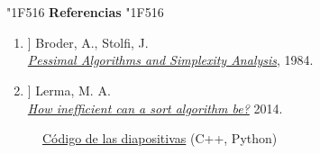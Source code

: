 \documentclass[plain]{beamer}
\newcommand{\ee}[1]{{\emojifont \char"#1{}}}
\begin{document}
\section{}
\begin{frame}\large
	\begin{center}
		{\LARGE \ee{1F516} \textbf{Referencias} \ee{1F516}}
	\end{center}
	\begin{enumerate}
		\item[\color{black}[1\!\!\!]] Broder, A., Stolfi, J.\label{uno}\\
		\href{https://www.mipmip.org/tidbits/pasa.pdf}
		{\textit{Pessimal Algorithms and Simplexity Analysis}}, 1984.
		\item[\color{black}[2\!\!\!]] Lerma, M. A.\label{dos}\\
		\href{https://sites.math.northwestern.edu/~mlerma/papers/inefficient_algorithms.pdf}
		{\textit{How inefficient can a sort algorithm be?}} 2014.
	\end{enumerate}
\begin{figure}[!h]
	\caption*{\href{https://gitlab.com/celiaru/simplicidad}{Código de las diapositivas} (C++, Python)}
\end{figure}
\end{frame}
\end{document}
